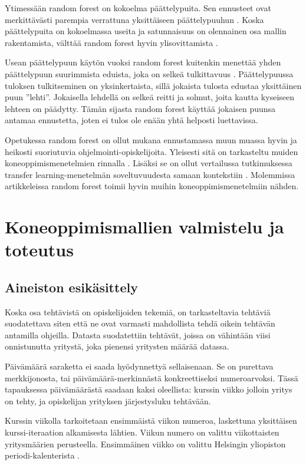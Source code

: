 \documentclass[finnish,twoside,openright]{HYgraduMLDS}
\begin{document}
Ytimessään random forest on kokoelma päättelypuita. Sen ennusteet ovat merkittävästi parempia verrattuna yksittäiseen päättelypuuhun \cite{james2013ISLR}. Koska päättelypuita on kokoelmassa useita ja satunnaisuus on olennainen osa mallin rakentamista, välttää random forest hyvin ylisovittamista \cite{james2013ISLR}. 

Usean päättelypuun käytön vuoksi random forest kuitenkin menettää yhden päättelypuun suurimmista eduista, joka on selkeä tulkittavuus \cite{james2013ISLR}. Päättelypuussa tuloksen tulkitseminen on yksinkertaista, sillä jokaista tulosta edustaa yksittäinen puun ''lehti''. Jokaisella lehdellä on selkeä reitti ja solmut, joita kautta kyseiseen lehteen on päädytty. Tämän sijasta random forest käyttää jokaisen puunsa antamaa ennustetta, joten ei tulos ole enään yhtä helposti luettavissa.

Opetukessa random forest on ollut mukana ennustamassa muun muassa hyvin ja heikosti suoriutuvia ohjelmointi-opiskelijoita. Yleisesti sitä on tarkasteltu muiden koneoppimismenetelmien rinnalla \cite{Ahadi:2015:EML:2787622.2787717}. Lisäksi se on ollut vertailussa tutkimuksessa transfer learning-menetelmän soveltuvuudesta samaan kontekstiin \cite{lagus2018transfer}. Molemmissa artikkeleissa random forest toimii hyvin muihin koneoppimismenetelmiin nähden.


\chapter{Koneoppimismallien valmistelu ja toteutus\label{chapter:toteutus}}

\section{Aineiston esikäsittely}

Koska osa tehtävistä on opiskelijoiden tekemiä, on tarkasteltavia tehtäviä suodatettava siten että ne ovat varmasti mahdollista tehdä oikein tehtävän antamilla ohjeilla. Datasta suodatettiin tehtävät, joissa on vähintään viisi onnistunutta yritystä, joka pienensi yritysten määrää datassa.

Päivämäärä saraketta ei saada hyödynnettyä sellaisenaan. Se on purettava merkkijonosta, tai päivämäärä-merkinnästä konkreettiseksi numeroarvoksi. Tässä tapauksessa päivämäärästä saadaan kaksi oleellista: kurssin viikko jolloin yritys on tehty, ja opiskelijan yrityksen järjestysluku tehtävään.

Kurssin viikolla tarkoitetaan ensimmäistä viikon numeroa, laskettuna yksittäisen kurssi-iteraation alkamisesta lähtien. Viikun numero on valittu viikottaisten yritysmäärien perusteella. Ensimmäinen viikko on valittu Helsingin yliopiston periodi-kalenterista \cite{kalenteri18-19, kalenteri19-20}.
\end{document}
